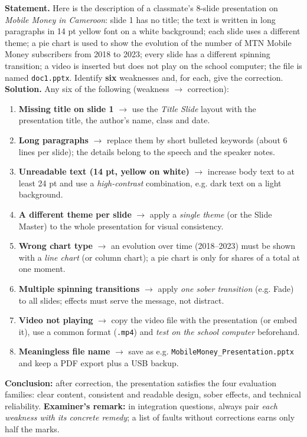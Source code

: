 \documentclass[11pt]{article}
\begin{document}
\begin{exoresolu}
\textbf{Statement.} Here is the description of a classmate's 8-slide presentation on \emph{Mobile Money in Cameroon}: slide 1 has no title; the text is written in long paragraphs in 14 pt yellow font on a white background; each slide uses a different theme; a pie chart is used to show the evolution of the number of MTN Mobile Money subscribers from 2018 to 2023; every slide has a different spinning transition; a video is inserted but does not play on the school computer; the file is named \texttt{doc1.pptx}. Identify \textbf{six} weaknesses and, for each, give the correction.
\tcblower
\textbf{Solution.} Any six of the following (weakness $\rightarrow$ correction):
\begin{enumerate}
\item \textbf{Missing title on slide 1} $\rightarrow$ use the \emph{Title Slide} layout with the presentation title, the author's name, class and date.
\item \textbf{Long paragraphs} $\rightarrow$ replace them by short bulleted keywords (about 6 lines per slide); the details belong to the speech and the speaker notes.
\item \textbf{Unreadable text (14 pt, yellow on white)} $\rightarrow$ increase body text to at least 24 pt and use a \emph{high-contrast} combination, e.g. dark text on a light background.
\item \textbf{A different theme per slide} $\rightarrow$ apply a \emph{single theme} (or the Slide Master) to the whole presentation for visual consistency.
\item \textbf{Wrong chart type} $\rightarrow$ an evolution over time (2018--2023) must be shown with a \emph{line chart} (or column chart); a pie chart is only for shares of a total at one moment.
\item \textbf{Multiple spinning transitions} $\rightarrow$ apply \emph{one sober transition} (e.g. Fade) to all slides; effects must serve the message, not distract.
\item \textbf{Video not playing} $\rightarrow$ copy the video file with the presentation (or embed it), use a common format (\texttt{.mp4}) and \emph{test on the school computer} beforehand.
\item \textbf{Meaningless file name} $\rightarrow$ save as e.g. \texttt{MobileMoney\_Presentation.pptx} and keep a PDF export plus a USB backup.
\end{enumerate}
\textbf{Conclusion:} after correction, the presentation satisfies the four evaluation families: clear content, consistent and readable design, sober effects, and technical reliability.
\textbf{Examiner's remark:} in integration questions, always pair \emph{each weakness with its concrete remedy}; a list of faults without corrections earns only half the marks.
\end{exoresolu}
\end{document}
